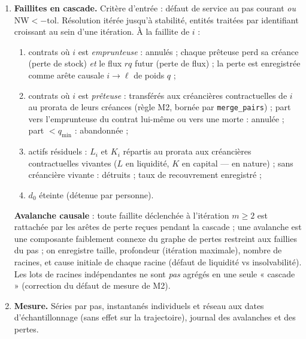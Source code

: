 \documentclass[11pt,a4paper]{article}
\newcommand{\NW}{\mathrm{NW}}
\newcommand{\code}[1]{\texttt{#1}}
\begin{document}
\begin{enumerate}[leftmargin=1.8em, itemsep=3pt]
  l'échantillon ; emprunteuse $b$ : $\arg\min K$ (rendement marginal
  $\alpha/(2\sqrt{K})$ maximal). Conditions : $\ell \ne b$, $A_\ell > 0$,
  $K_\ell > K_b$ (gain à l'échange). Taux marginaux
  $r_x = \alpha / (2\sqrt{\max(K_x, 10^{-9})})$ ; taux du contrat
  $r = \sqrt{r_\ell r_b}$ (moyenne géométrique, constitutive d'après M2) ;
  coût effectif $\rho = r + \delta$ ; cible
  $K^*(\rho) = (\alpha/(2\rho))^2$ ; volume
  $q = \min\!\big(A_\ell,\; \max(0, K^*(\rho) - K_b)\big)$, abandon si
  $q < q_{\min}$. Exécution : $L_\ell \mathrel{-}= q$ ;
  \textbf{$K_b \mathrel{+}= q$} (crédit productif, baseline) ou
  $L_b \mathrel{+}= q$ (ablation C) ; création du contrat
  $(\ell, b, q, r, t, \tau)$. Un prêt crée donc simultanément : un gain
  productif réel chez $b$, une obligation nominale persistante $rq$/pas, et
  une exposition risquée $q$ chez $\ell$.
\item \textbf{Faillites en cascade.} Critère d'entrée : défaut de service au
  pas courant \emph{ou} $\NW < -\mathrm{tol}$. Résolution itérée jusqu'à
  stabilité, entités traitées par identifiant croissant au sein d'une
  itération. À la faillite de $i$ :
  \begin{enumerate}[leftmargin=1.4em, itemsep=1pt]
  \item contrats où $i$ est \emph{emprunteuse} : annulés ; chaque prêteuse
    perd sa créance (perte de stock) \emph{et} le flux $rq$ futur (perte de
    flux) ; la perte est enregistrée comme arête causale $i \to \ell$ de
    poids $q$ ;
  \item contrats où $i$ est \emph{prêteuse} : transférés aux créancières
    contractuelles de $i$ au prorata de leurs créances (règle M2, bornée par
    \code{merge\_pairs}) ; part vers l'emprunteuse du contrat lui-même ou vers
    une morte : annulée ; part $< q_{\min}$ : abandonnée ;
  \item actifs résiduels : $L_i$ et $K_i$ répartis au prorata aux créancières
    contractuelles vivantes ($L$ en liquidité, $K$ en capital --- en nature) ;
    sans créancière vivante : détruits ; taux de recouvrement enregistré ;
  \item $d_0$ éteinte (détenue par personne).
  \end{enumerate}
  \textbf{Avalanche causale} : toute faillite déclenchée à l'itération
  $m \ge 2$ est rattachée par les arêtes de perte reçues pendant la cascade ;
  une avalanche est une composante faiblement connexe du graphe de pertes
  restreint aux faillies du pas ; on enregistre taille, profondeur (itération
  maximale), nombre de racines, et cause initiale de chaque racine (défaut de
  liquidité vs insolvabilité). Les lots de racines indépendantes ne sont
  \emph{pas} agrégés en une seule « cascade » (correction du défaut de mesure
  de M2).
\item \textbf{Mesure.} Séries par pas, instantanés individuels et réseau aux
  dates d'échantillonnage (sans effet sur la trajectoire), journal des
  avalanches et des pertes.
\end{enumerate}
\end{document}
